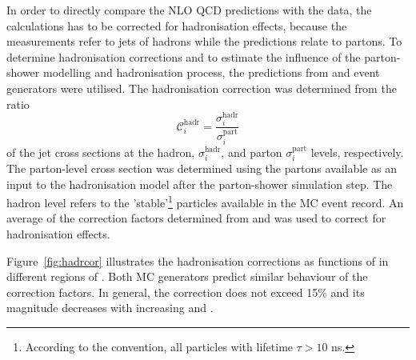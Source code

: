 In order to directly compare the NLO QCD predictions with the data, the calculations has to be corrected for hadronisation effects, because the measurements refer to jets of hadrons while the predictions relate to partons. To determine hadronisation corrections and to estimate the influence of the parton-shower modelling and hadronisation process, the predictions from \ariadne and \lepto event generators were utilised. The hadronisation correction was determined from the ratio 
\begin{equation}
 \mathcal{C}^\text{hadr}_i = \frac{\sigma_i^\text{hadr}}{\sigma_i^\text{part}}
 \label{eq:hadrcor}
\end{equation}
of the jet cross sections at the hadron, $\sigma_i^\text{hadr}$, and parton $\sigma_i^\text{part}$ levels, respectively. The parton-level cross section was determined using the partons available as an input to the hadronisation model after the parton-shower simulation step. The hadron level refers to the 'stable'\footnote{According to the \zeus convention, all particles with lifetime $\tau > 10$ ns.} particles available in the MC event record. An average of the correction factors determined from \ariadne and \lepto was used to correct for hadronisation effects.

Figure~\ref{fig:hadrcor} illustrates the hadronisation corrections as functions of \etjetb in different regions of \qsq. Both MC generators predict similar behaviour of the correction factors. In general, the correction does not exceed 15\% and its magnitude decreases with increasing \etjetb and \qsq.



